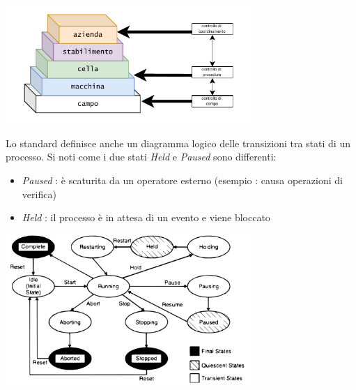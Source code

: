 \documentclass[10pt, letterpaper]{report}
\begin{document}
\begin{center}
        \includegraphics[width=0.7\textwidth ]{images/cim2.pdf}
\end{center}
Lo standard definisce anche un diagramma logico delle transizioni tra stati di un processo. Si noti come 
i due stati \textit{Held} e  \textit{Paused} sono differenti: \begin{itemize}
    \item \textit{Paused} : è scaturita da un operatore esterno (esempio : causa operazioni di verifica) 
    \item \textit{Held} : il processo è in attesa di un evento e viene bloccato
\end{itemize}
\begin{center}
    \includegraphics[width=0.7\textwidth ]{images/statiProcesso.pdf}
\end{center}
\end{document}
